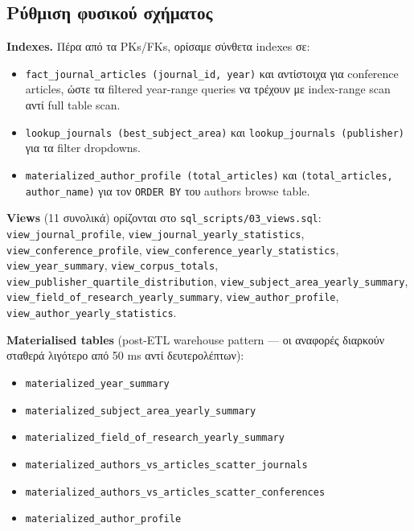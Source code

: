 \subsection{Ρύθμιση φυσικού σχήματος}
\label{sec:physical}

\textbf{Indexes.} Πέρα από τα PKs/FKs, ορίσαμε σύνθετα indexes σε:

\begin{itemize}
    \item \texttt{fact\_journal\_articles (journal\_id, year)} και αντίστοιχα
          για conference articles, ώστε τα filtered year-range queries να
          τρέχουν με index-range scan αντί full table scan.
    \item \texttt{lookup\_journals (best\_subject\_area)} και
          \texttt{lookup\_journals (publisher)} για τα filter dropdowns.
    \item \texttt{materialized\_author\_profile (total\_articles)} και
          \texttt{(total\_articles, author\_name)} για τον \texttt{ORDER BY}
          του authors browse table.
\end{itemize}

\textbf{Views} (11 συνολικά) ορίζονται στο \texttt{sql\_scripts/03\_views.sql}:
\texttt{view\_journal\_profile}, \texttt{view\_journal\_yearly\_statistics},
\texttt{view\_conference\_profile}, \texttt{view\_conference\_yearly\_statistics},
\texttt{view\_year\_summary}, \texttt{view\_corpus\_totals},
\texttt{view\_publisher\_quartile\_distribution},
\texttt{view\_subject\_area\_yearly\_summary},
\texttt{view\_field\_of\_research\_yearly\_summary},
\texttt{view\_author\_profile}, \texttt{view\_author\_yearly\_statistics}.

\textbf{Materialised tables} (post-ETL warehouse pattern --- οι αναφορές διαρκούν
σταθερά λιγότερο από 50 ms αντί δευτερολέπτων):

\begin{itemize}
    \item \texttt{materialized\_year\_summary}
    \item \texttt{materialized\_subject\_area\_yearly\_summary}
    \item \texttt{materialized\_field\_of\_research\_yearly\_summary}
    \item \texttt{materialized\_authors\_vs\_articles\_scatter\_journals}
    \item \texttt{materialized\_authors\_vs\_articles\_scatter\_conferences}
    \item \texttt{materialized\_author\_profile}
\end{itemize}

